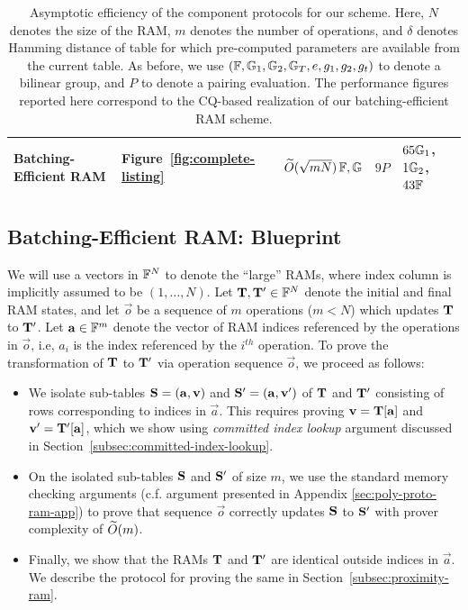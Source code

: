 \begin{table}[bt]
{\begin{tabular}{|l|l|l|l|l|}
        \rowcolor{lightgray}
        {Batching-Efficient RAM}                                                                          & {Figure~\ref{fig:complete-listing}}    & {$\widetilde{O}(\sqrt{mN})\,\mathbb{F},\mathbb{G}$}            & ${9P}$            & {$65\mathbb{G}_1$, $1\mathbb{G}_2$, $43\mathbb{F}$}  \\ \hline
    \end{tabular}
	}
    \caption{Asymptotic efficiency of the component protocols for our scheme. Here, $N$ denotes the size of the RAM, $m$ denotes the number of operations,
    and $\delta$ denotes Hamming distance of table for which pre-computed parameters are available from the current table. As before, we use $(\mathbb{F},\mathbb{G}_1,\mathbb{G}_2,\mathbb{G}_T, e, g_1, g_2,g_t)$ to denote a bilinear group, and $P$ to denote a pairing evaluation. The performance figures reported here correspond to the CQ-based realization of our batching-efficient RAM scheme.}
    \label{tbl:efficiency-components}
\end{table}



\subsection{Batching-Efficient RAM: Blueprint}\label{subsec:batching-efficient-ram-blueprint}
We will use a vectors in $\mathbb{F}^N$ to denote the ``large'' RAMs, where index column is implicitly
assumed to be $(1,\ldots,N)$.
Let $\mathbf{T},\mathbf{T'}\in \mathbb{F}^N$ denote the initial and final RAM states, and let $\vec{o}$ be
a sequence of $m$ operations ($m < N$) which updates $\mathbf{T}$ to $\mathbf{T}'$. Let $\mathbf{a}\in \mathbb{F}^m$ denote the vector
of RAM indices referenced by the operations in $\vec{o}$, i.e, $a_i$ is the index referenced by the $i^{th}$ operation.
To prove the transformation of $\mathbf{T}$ to $\mathbf{T}'$ via operation sequence $\vec{o}$, we proceed as follows:
\begin{itemize}[leftmargin=1em, label=-]
    \item We isolate sub-tables $\mathbf{S}=(\mathbf{a},\mathbf{v})$ and $\mathbf{S}'=(\mathbf{a},\mathbf{v'})$ of $\mathbf{T}$ and $\mathbf{T}'$ consisting of
    rows corresponding to indices in $\vec{a}$. This requires proving $\mathbf{v}=\mathbf{T}[\mathbf{a}]$ and $\mathbf{v'}=
    \mathbf{T}'[\mathbf{a}]$, which we show using {\em committed index lookup} argument discussed in Section~\ref{subsec:committed-index-lookup}.

    \item On the isolated sub-tables $\mathbf{S}$ and $\mathbf{S}'$ of size $m$, we use the standard memory checking arguments (c.f. argument
    presented in Appendix \ref{sec:poly-proto-ram-app}) to prove that sequence $\vec{o}$ correctly updates $\mathbf{S}$ to $\mathbf{S}'$ with
    prover complexity of $\widetilde{O}(m)$.

    \item Finally, we show that the RAMs $\mathbf{T}$ and $\mathbf{T}'$ are identical outside indices in $\vec{a}$. We describe the protocol
    for proving the same in Section~\ref{subsec:proximity-ram}.
\end{itemize}

